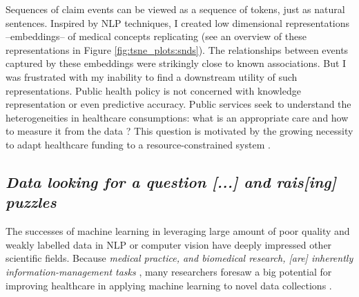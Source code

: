 \documentclass[french,12pt,twoside,a4paper]{book}
\begin{document}
Sequences of claim events can be viewed as a sequence of tokens, just as natural
sentences. Inspired by NLP techniques, I created low dimensional representations
--embeddings-- of medical concepts replicating \cite{beam2019clinical} (see an
overview of these representations in Figure \ref{fig:tsne_plots:snds}). The
relationships between events captured by these embeddings were strikingly
close to known associations. But I was frustrated with my inability to find a
downstream utility of such representations. Public health policy is not
concerned with knowledge representation or even predictive accuracy. Public
services seek to understand the heterogeneities in healthcare consumptions: what
is an appropriate care and how to measure it from the data
\citep{cma_policy_appropriateness_2015}? This question is motivated by the
growing necessity to adapt healthcare funding to a resource-constrained system
\citep{mcginnis2013best,aubert_2019}.



\subsection{\textit{Data looking for a question [...] and rais[ing] puzzles} \citep{cox2001statistical}}%
\label{subsec:intro:wrapup}%

The successes of machine learning in leveraging large amount of poor quality and
weakly labelled data in NLP or computer vision have deeply impressed other
scientific fields. Because \textit{medical practice, and biomedical research,
  [are] inherently information-management tasks} \citep{patel2009coming},
many researchers foresaw a big potential for improving healthcare in applying
machine learning to novel data collections
\citep{topol2019high,rajkomar2019machine}.
\end{document}
